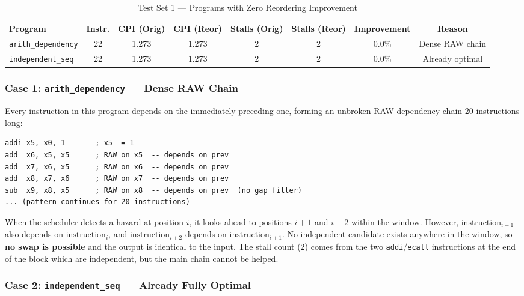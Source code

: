 \documentclass[11pt]{report}
\begin{document}
\begin{table}[H]
\centering
\caption{Test Set 1 --- Programs with Zero Reordering Improvement}
\label{tab:test1}
\renewcommand{\arraystretch}{1.3}
\begin{adjustbox}{max width=\linewidth, center}
\footnotesize
\begin{tabular}{@{}lccccccc@{}}
\toprule
\textbf{Program} & \textbf{Instr.} & \textbf{CPI (Orig)} & \textbf{CPI (Reor)} & \textbf{Stalls (Orig)} & \textbf{Stalls (Reor)} & \textbf{Improvement} & \textbf{Reason} \\
\midrule
\texttt{arith\_dependency} & 22 & 1.273 & 1.273 & 2 & 2 & 0.0\% & Dense RAW chain \\
\texttt{independent\_seq}  & 22 & 1.273 & 1.273 & 2 & 2 & 0.0\% & Already optimal \\
\bottomrule
\end{tabular}
\end{adjustbox}
\end{table}

\subsubsection{Case 1: \texttt{arith\_dependency} --- Dense RAW Chain}

Every instruction in this program depends on the immediately preceding one, forming an unbroken RAW dependency chain 20 instructions long:

\begin{verbatim}
addi x5, x0, 1       ; x5  = 1
add  x6, x5, x5      ; RAW on x5  -- depends on prev
add  x7, x6, x5      ; RAW on x6  -- depends on prev
add  x8, x7, x6      ; RAW on x7  -- depends on prev
sub  x9, x8, x5      ; RAW on x8  -- depends on prev  (no gap filler)
... (pattern continues for 20 instructions)
\end{verbatim}

When the scheduler detects a hazard at position $i$, it looks ahead to positions $i{+}1$ and $i{+}2$ within the window. However, $\text{instruction}_{i+1}$ also depends on $\text{instruction}_i$, and $\text{instruction}_{i+2}$ depends on $\text{instruction}_{i+1}$. No independent candidate exists anywhere in the window, so \textbf{no swap is possible} and the output is identical to the input. The stall count (2) comes from the two \texttt{addi}/\texttt{ecall} instructions at the end of the block which are independent, but the main chain cannot be helped.

\subsubsection{Case 2: \texttt{independent\_seq} --- Already Fully Optimal}
\end{document}
